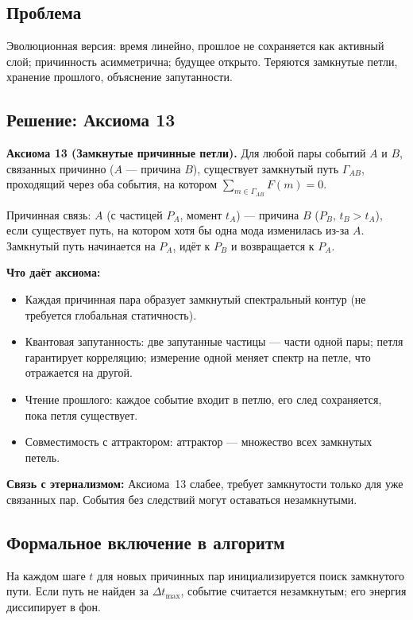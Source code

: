 \documentclass[12pt,a4paper]{article}
\begin{document}
\subsection{Проблема}
Эволюционная версия: время линейно, прошлое не сохраняется как активный слой; причинность асимметрична; будущее открыто. Теряются замкнутые петли, хранение прошлого, объяснение запутанности.

\subsection{Решение: Аксиома 13}
\textbf{Аксиома 13 (Замкнутые причинные петли).} Для любой пары событий $A$ и $B$, связанных причинно ($A$ --- причина $B$), существует замкнутый путь $\Gamma_{AB}$, проходящий через оба события, на котором $\sum_{m \in \Gamma_{AB}} F(m) = 0$.

Причинная связь: $A$ (с частицей $P_A$, момент $t_A$) --- причина $B$ ($P_B$, $t_B > t_A$), если существует путь, на котором хотя бы одна мода изменилась из-за $A$. Замкнутый путь начинается на $P_A$, идёт к $P_B$ и возвращается к $P_A$.

\textbf{Что даёт аксиома:}
\begin{itemize}
    \item Каждая причинная пара образует замкнутый спектральный контур (не требуется глобальная статичность).
    \item Квантовая запутанность: две запутанные частицы --- части одной пары; петля гарантирует корреляцию; измерение одной меняет спектр на петле, что отражается на другой.
    \item Чтение прошлого: каждое событие входит в петлю, его след сохраняется, пока петля существует.
    \item Совместимость с аттрактором: аттрактор --- множество всех замкнутых петель.
\end{itemize}

\textbf{Связь с этернализмом:} Аксиома~13 слабее, требует замкнутости только для уже связанных пар. События без следствий могут оставаться незамкнутыми.

\subsection{Формальное включение в алгоритм}
На каждом шаге $t$ для новых причинных пар инициализируется поиск замкнутого пути. Если путь не найден за $\Delta t_{\max}$, событие считается незамкнутым; его энергия диссипирует в фон.
\end{document}
